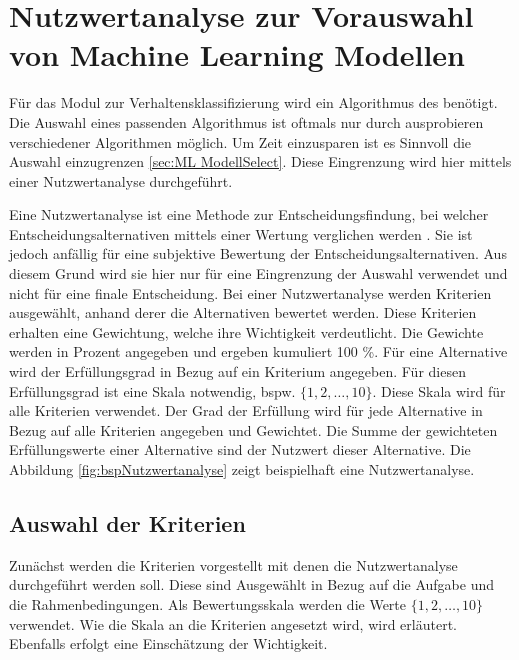 \section{Nutzwertanalyse zur Vorauswahl von Machine Learning Modellen} \label{sec:Meth Nutzwert}
Für das \gls{Modul} zur Verhaltensklassifizierung wird ein Algorithmus des  benötigt. Die Auswahl eines passenden Algorithmus ist oftmals nur durch ausprobieren verschiedener Algorithmen möglich. Um Zeit einzusparen ist es Sinnvoll die Auswahl einzugrenzen \ref{sec:ML ModellSelect}. Diese Eingrenzung wird hier mittels einer Nutzwertanalyse durchgeführt. \par

Eine Nutzwertanalyse ist eine Methode zur Entscheidungsfindung, bei welcher Entscheidungsalternativen mittels einer Wertung verglichen werden \cite{Kuhnapfel.2021}. Sie ist jedoch anfällig für eine subjektive Bewertung der Entscheidungsalternativen. Aus diesem Grund wird sie hier nur für eine Eingrenzung der Auswahl verwendet und nicht für eine finale Entscheidung. Bei einer Nutzwertanalyse werden Kriterien ausgewählt, anhand derer die Alternativen bewertet werden. Diese Kriterien erhalten eine Gewichtung, welche ihre Wichtigkeit verdeutlicht. Die Gewichte werden in Prozent angegeben und ergeben kumuliert 100 \%. Für eine Alternative wird der Erfüllungsgrad in Bezug auf ein Kriterium angegeben. Für diesen Erfüllungsgrad ist eine Skala notwendig, bspw. \(\{1,2,\dots,10\}\). Diese Skala wird für alle Kriterien verwendet. Der Grad der Erfüllung wird für jede Alternative in Bezug auf alle Kriterien angegeben und Gewichtet. Die Summe der gewichteten Erfüllungswerte einer Alternative sind der Nutzwert dieser Alternative. Die Abbildung \ref{fig:bspNutzwertanalyse} zeigt beispielhaft eine Nutzwertanalyse.



\subsection{Auswahl der Kriterien}
Zunächst werden die Kriterien vorgestellt mit denen die Nutzwertanalyse durchgeführt werden soll. Diese sind Ausgewählt in Bezug auf die Aufgabe und die Rahmenbedingungen. Als Bewertungsskala werden die Werte \(\{1,2,\dots,10\}\) verwendet. Wie die Skala an die Kriterien angesetzt wird, wird erläutert. Ebenfalls erfolgt eine Einschätzung der Wichtigkeit.\par

